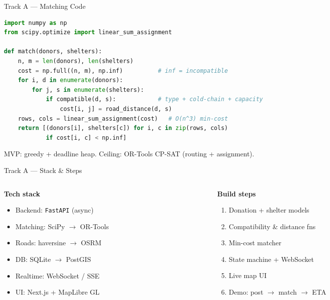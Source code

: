 \documentclass[10pt,aspectratio=169]{beamer}
\begin{document}
\begin{frame}[fragile]{Track A — Matching Code}
\begin{lstlisting}[language=Python]
import numpy as np
from scipy.optimize import linear_sum_assignment

def match(donors, shelters):
    n, m = len(donors), len(shelters)
    cost = np.full((n, m), np.inf)          # inf = incompatible
    for i, d in enumerate(donors):
        for j, s in enumerate(shelters):
            if compatible(d, s):            # type + cold-chain + capacity
                cost[i, j] = road_distance(d, s)
    rows, cols = linear_sum_assignment(cost)   # O(n^3) min-cost
    return [(donors[i], shelters[c]) for i, c in zip(rows, cols)
            if cost[i, c] < np.inf]
\end{lstlisting}
\footnotesize MVP: greedy + deadline heap. Ceiling: OR-Tools CP-SAT (routing + assignment).
\end{frame}

\begin{frame}{Track A — Stack \& Steps}
  \begin{columns}[T]
    \begin{column}{0.48\textwidth}
      \textbf{Tech stack}
      \begin{itemize}\small
        \item Backend: \texttt{FastAPI} (async)
        \item Matching: SciPy $\to$ OR-Tools
        \item Roads: haversine $\to$ OSRM
        \item DB: SQLite $\to$ PostGIS
        \item Realtime: WebSocket / SSE
        \item UI: Next.js + MapLibre GL
      \end{itemize}
    \end{column}
    \begin{column}{0.48\textwidth}
      \textbf{Build steps}
      \begin{enumerate}\small
        \item Donation + shelter models
        \item Compatibility \& distance fns
        \item Min-cost matcher
        \item State machine + WebSocket
        \item Live map UI
        \item Demo: post $\to$ match $\to$ ETA
      \end{enumerate}
    \end{column}
  \end{columns}
\end{frame}
\end{document}
